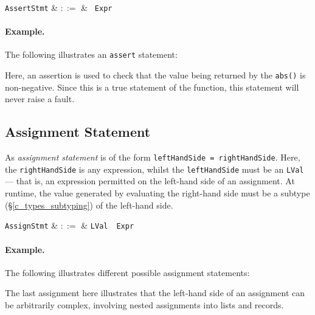 \begin{syntax}
  \verb+AssertStmt+ & $::=$ & \ \verb+Expr+\\
\end{syntax}

\paragraph{Example.} The following illustrates an \lstinline{assert} statement:



Here, an assertion is used to check that the value being returned by the \lstinline{abs()} is non-negative.  Since this is a true statement of the function, this statement will never raise a fault.


\subsection{Assignment Statement}

As {\em assignment statement} is of the form \lstinline{leftHandSide = rightHandSide}.  Here, the \lstinline{rightHandSide} is any expression, whilst the \lstinline{leftHandSide} must be an \lstinline{LVal} --- that is, an expression permitted on the left-hand side of an assignment.  At runtime, the value generated by evaluating the right-hand side must be a subtype (\S\ref{c_types_subtyping}) of the left-hand side.

\begin{syntax}
  \verb+AssignStmt+ & $::=$ & \verb+LVal+\ \token{=}\ \verb+Expr+\\
\end{syntax}


\paragraph{Example.} The following illustrates different possible assignment statements:



The last assignment here illustrates that the left-hand side of an assignment can be arbitrarily complex, involving nested assignments into lists and records.


